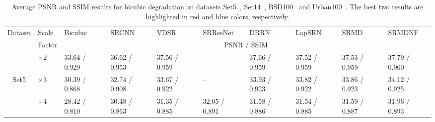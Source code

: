 \documentclass[10pt,twocolumn,letterpaper]{article}
\begin{document}
\begin{table}[!htbp]\scriptsize
\caption{Average PSNR and SSIM results for bicubic degradation on datasets Set5~\cite{bevilacqua2012low}, Set14~\cite{zeyde2010single}, BSD100~\cite{MartinFTM01} and Urban100~\cite{huang2015single}. The best two results are highlighted in \textcolor[rgb]{1.00,0.00,0.00}{red} and \textcolor[rgb]{0.00,0.00,1.00}{blue} colors, respectively.} \vspace{-0.16cm}%
\center
\begin{tabular}{|c|p{0.9cm}<{\centering}|p{1.4cm}<{\centering}|p{1.4cm}<{\centering}|p{1.4cm}<{\centering}|p{1.4cm}<{\centering}|p{1.4cm}<{\centering}|p{1.4cm}<{\centering}|p{1.4cm}<{\centering}|p{1.4cm}<{\centering}|}
  \hline
 \multirow{2}{*}{Dataset} & Scale & Bicubic & SRCNN~\cite{dong2016image} & VDSR~\cite{kim2015accurate} & SRResNet~\cite{ledig2016photo}  & DRRN~\cite{taiimage}  & LapSRN~\cite{lai2017deep} & SRMD  & SRMDNF\\\cline{3-10}
  & Factor & \multicolumn{8}{c|}{PSNR / SSIM}\\ \hline\hline
  &$\times 2$ & 33.64 / 0.929 &  36.62 / 0.953 &37.56 / 0.959 & --  & \textcolor[rgb]{0.00,0.00,1.00}{37.66} / \textcolor[rgb]{0.00,0.00,1.00}{0.959}  & 37.52 / 0.959 & 37.53 / 0.959  &  \textcolor[rgb]{1.00,0.00,0.00}{37.79} / \textcolor[rgb]{1.00,0.00,0.00}{0.960} \\
 Set5 &$\times 3$ & 30.39 / 0.868 &  32.74 / 0.908 &33.67 / 0.922 & --  & \textcolor[rgb]{0.00,0.00,1.00}{33.93} / \textcolor[rgb]{0.00,0.00,1.00}{0.923} & 33.82 / 0.922 & 33.86 / 0.923 & \textcolor[rgb]{1.00,0.00,0.00}{34.12} / \textcolor[rgb]{1.00,0.00,0.00}{0.925}\\
  &$\times 4$ & 28.42 / 0.810 &  30.48 / 0.863 &31.35 / 0.885 & \textcolor[rgb]{1.00,0.00,0.00}{32.05} / \textcolor[rgb]{0.00,0.00,1.00}{0.891}  & 31.58 / 0.886 & 31.54 / 0.885 & 31.59 / 0.887 & \textcolor[rgb]{0.00,0.00,1.00}{31.96} / \textcolor[rgb]{1.00,0.00,0.00}{0.893} \\\hline


\end{tabular}
\end{table}
\end{document}
